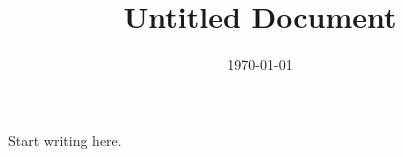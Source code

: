 \documentclass[11pt]{article}
\title{Untitled Document}
\author{}
\date{\today}
\begin{document}
\maketitle

Start writing here.
\end{document}
